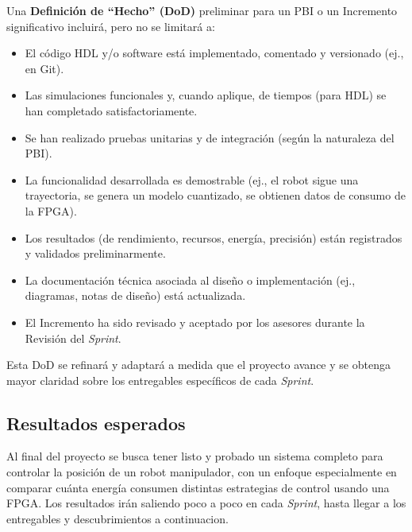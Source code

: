 \documentclass[12pt]{article}
\begin{document}
Una \textbf{Definición de ``Hecho'' (DoD)} preliminar para un PBI o un Incremento significativo incluirá, pero no se limitará a:
\begin{itemize}
    \item El código HDL y/o software está implementado, comentado y versionado (ej., en Git).
    \item Las simulaciones funcionales y, cuando aplique, de tiempos (para HDL) se han completado satisfactoriamente.
    \item Se han realizado pruebas unitarias y de integración (según la naturaleza del PBI).
    \item La funcionalidad desarrollada es demostrable (ej., el robot sigue una trayectoria, se genera un modelo cuantizado, se obtienen datos de consumo de la FPGA).
    \item Los resultados (de rendimiento, recursos, energía, precisión) están registrados y validados preliminarmente.
    \item La documentación técnica asociada al diseño o implementación (ej., diagramas, notas de diseño) está actualizada.
    \item El Incremento ha sido revisado y aceptado por los asesores durante la Revisión del \textit{Sprint}.
\end{itemize}
Esta DoD se refinará y adaptará a medida que el proyecto avance y se obtenga mayor claridad sobre los entregables específicos de cada \textit{Sprint}.



\subsection{Resultados esperados}
\label{ssec:resultados_esperados}

Al final del proyecto se busca tener listo y probado un sistema completo para controlar la posición de un robot manipulador, con un enfoque especialmente en comparar cuánta energía consumen distintas estrategias de control usando una FPGA. Los resultados irán saliendo poco a poco en cada \textit{Sprint}, hasta llegar a los entregables y descubrimientos a continuacion.
\end{document}
